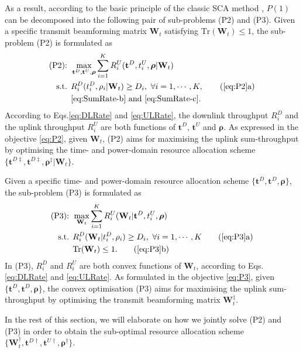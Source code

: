 \documentclass[12pt,draft,onecolumn,journal]{IEEEtran}
\begin{document}
As a result, according to the basic principle of the classic SCA method \cite{sca}, $P(1)$ can be decomposed into the following pair of sub-problems (P2) and (P3). Given a specific transmit beamforming matrix $\mathbf{W}_t$ satisfying $\text{Tr}(\mathbf{W}_t) \leq 1$, the sub-problem (P2) is formulated as
\begin{align}
	\text{(P2): } & \max_{\mathbf{t}^D, \mathbf{t}^U, \boldsymbol{\rho}} \sum_{i=1}^K R_{i}^U (\mathbf{t}^D, t_i^U, \boldsymbol{\rho} | \mathbf{W}_t) \label{eq:P2}\\
	\text{s.t. } & R_{i}^D (t_i^D, \rho_i | \mathbf{W}_t) \geq D_i,\ \forall i = 1,\cdots, K, \tag{\ref{eq:P2}a} \label{eq:P2-a}\\
	& \text{\eqref{eq:SumRate-b} and \eqref{eq:SumRate-c}.} \nonumber
\end{align}
According to Eqs.\eqref{eq:DLRate} and \eqref{eq:ULRate}, the downlink throughput $R_{i}^D$ and the uplink throughput $R_i^U$ are both functions of $\mathbf{t}^D$, $\mathbf{t}^U$ and $\boldsymbol{\rho}$. As expressed in the objective \eqref{eq:P2}, given $\mathbf{W}_t$, (P2) aims for maximising the uplink sum-throughput by optimising the time- and power-domain resource allocation scheme $\{\mathbf{t}^{D\ddagger}, \mathbf{t}^{D\ddagger}, \boldsymbol{\rho}^{\ddagger} | \mathbf{W}_t\}$. 

Given a specific time- and power-domain resource allocation scheme $\{\mathbf{t}^{D}, \mathbf{t}^{D}, \boldsymbol{\rho}\}$, the sub-problem (P3) is formulated as
\begin{align}
	\text{(P3): } & \max_{\mathbf{W}_t} \sum_{i=1}^{K}  R_{i}^U (\mathbf{W}_t | \mathbf{t}^D, t_i^U, \boldsymbol{\rho}) \label{eq:P3} \\
	\text{s.t. } & R_{i}^D ( \mathbf{W}_t | t_i^D, \rho_i ) \geq D_i,\ \forall i = 1,\cdots, K \tag{\ref{eq:P3}a} \\
	             & \text{Tr}(\mathbf{W}_t) \leq 1. \tag{\ref{eq:P3}b}
\end{align}
In (P3), $R_i^D$ and $R_i^U$ are both convex functions of $\mathbf{W}_t$, according to Eqs.\eqref{eq:DLRate} and \eqref{eq:ULRate}. As formulated in the objective \eqref{eq:P3}, given $\{\mathbf{t}^{D}, \mathbf{t}^{D}, \boldsymbol{\rho}\}$, the convex optimisation (P3) aims for maximising the uplink sum-throughput by optimising the transmit beamforming matrix $\mathbf{W}_t^{\ddagger}$.

In the rest of this section, we will elaborate on how we jointly solve (P2) and (P3) in order to obtain the sub-optimal resource allocation scheme $\{\mathbf{W}_t^\dagger, \mathbf{t}^{D\dagger}, \mathbf{t}^{U\dagger}, \boldsymbol{\rho}^\dagger\}$.
\end{document}
